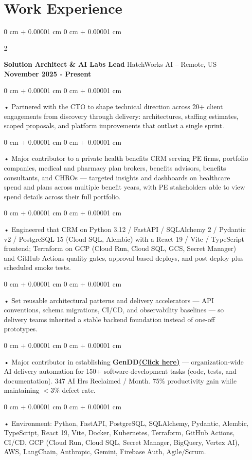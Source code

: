 \documentclass[10pt, letterpaper]{article}
\newenvironment{onecolentry}{
    \begin{adjustwidth}{
        0 cm + 0.00001 cm
    }{
        0 cm + 0.00001 cm
    }
}{
    \end{adjustwidth}
} %
\newenvironment{twocolentry}[2][]{
    \onecolentry
    \def\secondColumn{#2}
    \setcolumnwidth{\fill, 4.5 cm}
    \begin{paracol}{2}
}{
    \switchcolumn \raggedleft \secondColumn
    \end{paracol}
    \endonecolentry
} %
\begin{document}
    \vspace{0.5cm}
    \section{Work Experience}
        \vspace{0.1cm}

        \begin{twocolentry}{
            \textbf{November 2025 - Present}
        }
            \textbf{Solution Architect \& AI Labs Lead} HatchWorks AI -- Remote, US\end{twocolentry}

        \begin{onecolentry}
             • Partnered with the CTO to shape technical direction across 20+ client engagements from discovery through delivery: architectures, staffing estimates, scoped proposals, and platform improvements that outlast a single sprint.
        \end{onecolentry}
        \begin{onecolentry}
             • Major contributor to a private health benefits CRM serving PE firms, portfolio companies, medical and pharmacy plan brokers, benefits advisors, benefits consultants, and CHROs --- targeted insights and dashboards on healthcare spend and plans across multiple benefit years, with PE stakeholders able to view spend details across their full portfolio.
        \end{onecolentry}
        \begin{onecolentry}
             • Engineered that CRM on Python 3.12 / FastAPI / SQLAlchemy 2 / Pydantic v2 / PostgreSQL 15 (Cloud SQL, Alembic) with a React 19 / Vite / TypeScript frontend; Terraform on GCP (Cloud Run, Cloud SQL, GCS, Secret Manager) and GitHub Actions quality gates, approval-based deploys, and post-deploy plus scheduled smoke tests.
        \end{onecolentry}
        \begin{onecolentry}
             • Set reusable architectural patterns and delivery accelerators --- API conventions, schema migrations, CI/CD, and observability baselines --- so delivery teams inherited a stable backend foundation instead of one-off prototypes.
        \end{onecolentry}
        \begin{onecolentry}
             • Major contributor in establishing \textbf{GenDD}\href{https://hatchworks.com/generative-driven-development/}{\textbf{(Click here)}} --- organization-wide AI delivery automation for 150+ software-development tasks (code, tests, and documentation). 347 AI Hrs Reclaimed / Month. 75\% productivity gain while maintaining $<$3\% defect rate.
        \end{onecolentry}
        \begin{onecolentry}
             • Environment: Python, FastAPI, PostgreSQL, SQLAlchemy, Pydantic, Alembic, TypeScript, React 19, Vite, Docker, Kubernetes, Terraform, GitHub Actions, CI/CD, GCP (Cloud Run, Cloud SQL, Secret Manager, BigQuery, Vertex AI), AWS, LangChain, Anthropic, Gemini, Firebase Auth, Agile/Scrum.
        \end{onecolentry}
\end{document}
